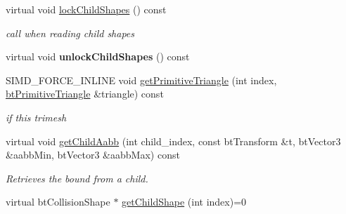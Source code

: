 \begin{DoxyCompactItemize}
\item 
\hypertarget{classbt_g_impact_shape_interface_ae5de49e788c97a954ab9f2bde16adf60}{virtual void \hyperlink{classbt_g_impact_shape_interface_ae5de49e788c97a954ab9f2bde16adf60}{lock\+Child\+Shapes} () const }\label{classbt_g_impact_shape_interface_ae5de49e788c97a954ab9f2bde16adf60}

\begin{DoxyCompactList}\small\item\em call when reading child shapes \end{DoxyCompactList}\item 
\hypertarget{classbt_g_impact_shape_interface_ac7da336fdb3165c1d086c766fe42114e}{virtual void {\bfseries unlock\+Child\+Shapes} () const }\label{classbt_g_impact_shape_interface_ac7da336fdb3165c1d086c766fe42114e}

\item 
\hypertarget{classbt_g_impact_shape_interface_a8b5c48d7831cebf1099b8c983cb3f149}{S\+I\+M\+D\+\_\+\+F\+O\+R\+C\+E\+\_\+\+I\+N\+L\+I\+N\+E void \hyperlink{classbt_g_impact_shape_interface_a8b5c48d7831cebf1099b8c983cb3f149}{get\+Primitive\+Triangle} (int index, \hyperlink{classbt_primitive_triangle}{bt\+Primitive\+Triangle} \&triangle) const }\label{classbt_g_impact_shape_interface_a8b5c48d7831cebf1099b8c983cb3f149}

\begin{DoxyCompactList}\small\item\em if this trimesh \end{DoxyCompactList}\item 
\hypertarget{classbt_g_impact_shape_interface_a341963a807a574ec30ae60284c831f5b}{virtual void \hyperlink{classbt_g_impact_shape_interface_a341963a807a574ec30ae60284c831f5b}{get\+Child\+Aabb} (int child\+\_\+index, const bt\+Transform \&t, bt\+Vector3 \&aabb\+Min, bt\+Vector3 \&aabb\+Max) const }\label{classbt_g_impact_shape_interface_a341963a807a574ec30ae60284c831f5b}

\begin{DoxyCompactList}\small\item\em Retrieves the bound from a child. \end{DoxyCompactList}\item 
\hypertarget{classbt_g_impact_shape_interface_a9f2827a4cb6e8376eb54aea84a8cc87b}{virtual bt\+Collision\+Shape $\ast$ \hyperlink{classbt_g_impact_shape_interface_a9f2827a4cb6e8376eb54aea84a8cc87b}{get\+Child\+Shape} (int index)=0}\label{classbt_g_impact_shape_interface_a9f2827a4cb6e8376eb54aea84a8cc87b}


\end{DoxyCompactItemize}
